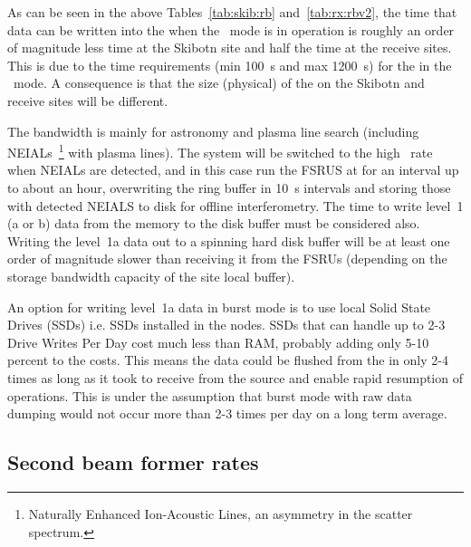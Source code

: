 \documentclass[12pt,a4paper]{article}
\begin{document}
As can be seen in the above Tables~\ref{tab:skib:rb} and~\ref{tab:rx:rbv2}, the time that data can be written into the \RB when the \WBW\ mode is in operation is roughly an order of magnitude less time at the Skibotn site and half the time at the receive sites.
This is due to the time requirements (min 100~s and max 1200~s) for the \RB in the \NBW\ mode. 
A consequence is that the size (physical) of the \RB on the Skibotn and receive sites will be different.

The \WBW{} bandwidth is mainly for astronomy and plasma line search (including NEIALs~\footnote{Naturally Enhanced Ion-Acoustic Lines, an asymmetry in the scatter spectrum.} with plasma lines). 
The system will be switched to the high \WBW\ rate when NEIALs are detected, and in this case run the FSRUS at \WBW{} for an interval up to about an hour, overwriting the ring buffer in 10~s intervals and storing those with detected NEIALS to disk for offline interferometry.
The time to write level~1 (a or b) data from the \RB memory to the disk buffer must be considered also. 
Writing the level~1a data out to a spinning hard disk buffer will be at least one order of magnitude slower than receiving it from the FSRUs (depending on the storage bandwidth capacity of the site local buffer). %

An option for writing level~1a data in burst mode is to use local Solid State Drives (SSDs) i.e. SSDs installed in the \RB nodes. 
SSDs that can handle up to 2-3 Drive Writes Per Day cost much less than RAM, probably adding only 5-10 percent to the \RB costs. 
This means the \WBW{} data could be flushed from the \RB in only 2-4 times as long as it took to receive from the source and enable rapid resumption of \NBW{} operations. 
This is under the assumption that \WBW{} burst mode with raw data dumping would not occur more than 2-3 times per day on a long term average. 

\subsection{Second beam former rates}
\label{ssec-sbf-rates}
\end{document}
